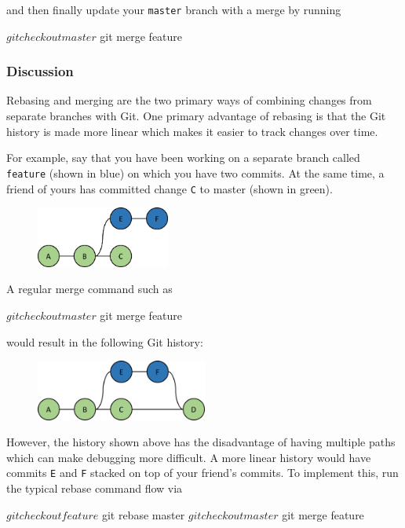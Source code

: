 \documentclass[12pt]{report}
\begin{document}
and then finally update your \texttt{master} branch with a merge by running

\begin{blockcode}
$ git checkout master
$ git merge feature
\end{blockcode}

\subsubsection*{Discussion}

Rebasing and merging are the two primary ways of combining changes from separate branches with Git.  One primary advantage of rebasing is that the Git history is made more linear which makes it easier to track changes over time.

For example, say that you have been working on a separate branch called \texttt{feature} (shown in blue) on which you have two commits.  At the same time, a friend of yours has committed change \texttt{C} to master (shown in green).

\begin{figure}[H]
\center
\includegraphics[height=2cm]{feature.png}
\end{figure}

A regular merge command such as
\begin{blockcode}
$ git checkout master
$ git merge feature
\end{blockcode}
would result in the following Git history:
\begin{figure}[h]
\center
\includegraphics[height=2cm]{merge.png}
\end{figure}

However, the history shown above has the disadvantage of having multiple paths which can make debugging more difficult.  A more linear history would have commits \texttt{E} and \texttt{F} stacked on top of your friend's commits.  To implement this, run the typical rebase command flow via
\begin{blockcode}
$ git checkout feature
$ git rebase master
$ git checkout master
$ git merge feature
\end{blockcode}
\end{document}
